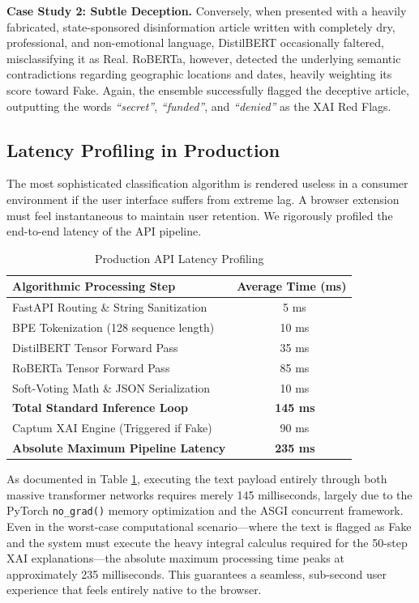 \documentclass[conference]{IEEEtran}
\begin{document}
\textbf{Case Study 2: Subtle Deception.} Conversely, when presented with a heavily fabricated, state-sponsored disinformation article written with completely dry, professional, and non-emotional language, DistilBERT occasionally faltered, misclassifying it as Real. RoBERTa, however, detected the underlying semantic contradictions regarding geographic locations and dates, heavily weighting its score toward Fake. Again, the ensemble successfully flagged the deceptive article, outputting the words \textit{``secret''}, \textit{``funded''}, and \textit{``denied''} as the XAI Red Flags.

\subsection{Latency Profiling in Production}
The most sophisticated classification algorithm is rendered useless in a consumer environment if the user interface suffers from extreme lag. A browser extension must feel instantaneous to maintain user retention. We rigorously profiled the end-to-end latency of the API pipeline.

\begin{table}[h]
\centering
\caption{Production API Latency Profiling}
\begin{tabular}{@{}lc@{}}
\toprule
\textbf{Algorithmic Processing Step} & \textbf{Average Time (ms)} \\ \midrule
FastAPI Routing \& String Sanitization & ~5 ms \\
BPE Tokenization (128 sequence length) & ~10 ms \\
DistilBERT Tensor Forward Pass         & ~35 ms \\
RoBERTa Tensor Forward Pass            & ~85 ms \\
Soft-Voting Math \& JSON Serialization & ~10 ms \\ \midrule
\textbf{Total Standard Inference Loop} & \textbf{~145 ms} \\ \midrule
Captum XAI Engine (Triggered if Fake)  & ~90 ms \\ \midrule
\textbf{Absolute Maximum Pipeline Latency} & \textbf{~235 ms} \\ \bottomrule
\end{tabular}
\label{tab:latency}
\end{table}

As documented in Table \ref{tab:latency}, executing the text payload entirely through both massive transformer networks requires merely 145 milliseconds, largely due to the PyTorch \texttt{no\_grad()} memory optimization and the ASGI concurrent framework. Even in the worst-case computational scenario—where the text is flagged as Fake and the system must execute the heavy integral calculus required for the 50-step XAI explanations—the absolute maximum processing time peaks at approximately 235 milliseconds. This guarantees a seamless, sub-second user experience that feels entirely native to the browser.
\end{document}
